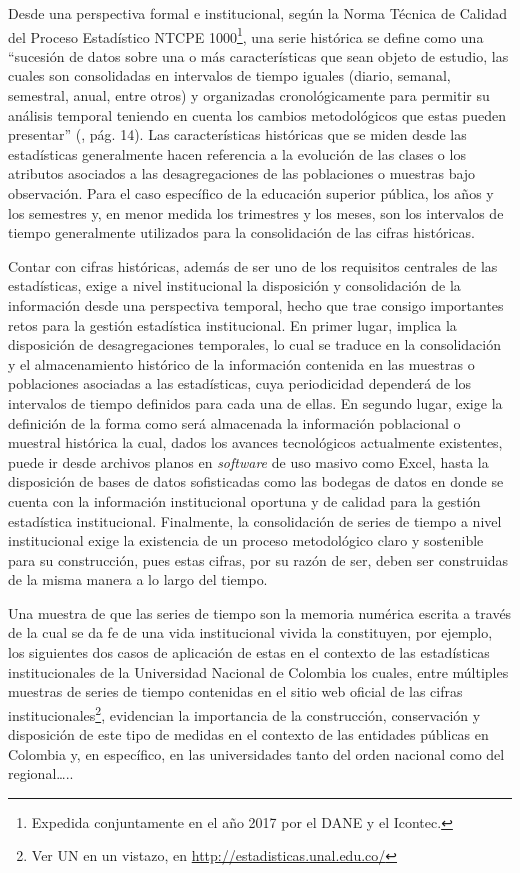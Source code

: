 \documentclass[
]{book}
\begin{document}
Desde una perspectiva formal e institucional, según la Norma Técnica de Calidad del Proceso Estadístico NTCPE 1000\footnote{Expedida conjuntamente en el año 2017 por el DANE y el Icontec.}, una serie histórica se define como una ``sucesión de datos sobre una o más características que sean objeto de estudio, las cuales son consolidadas en intervalos de tiempo iguales (diario, semanal, semestral, anual, entre otros) y organizadas cronológicamente para permitir su análisis temporal teniendo en cuenta los cambios metodológicos que estas pueden presentar'' (\citet{DaneIcontec}, pág. 14). Las características históricas que se miden desde las estadísticas generalmente hacen referencia a la evolución de las clases o los atributos asociados a las desagregaciones de las poblaciones o muestras bajo observación. Para el caso específico de la educación superior pública, los años y los semestres y, en menor medida los trimestres y los meses, son los intervalos de tiempo generalmente utilizados para la consolidación de las cifras históricas.

Contar con cifras históricas, además de ser uno de los requisitos centrales de las estadísticas, exige a nivel institucional la disposición y consolidación de la información desde una perspectiva temporal, hecho que trae consigo importantes retos para la gestión estadística institucional. En primer lugar, implica la disposición de desagregaciones temporales, lo cual se traduce en la consolidación y el almacenamiento histórico de la información contenida en las muestras o poblaciones asociadas a las estadísticas, cuya periodicidad dependerá de los intervalos de tiempo definidos para cada una de ellas. En segundo lugar, exige la definición de la forma como será almacenada la información poblacional o muestral histórica la cual, dados los avances tecnológicos actualmente existentes, puede ir desde archivos planos en \emph{software} de uso masivo como Excel, hasta la disposición de bases de datos sofisticadas como las bodegas de datos en donde se cuenta con la información institucional oportuna y de calidad para la gestión estadística institucional. Finalmente, la consolidación de series de tiempo a nivel institucional exige la existencia de un proceso metodológico claro y sostenible para su construcción, pues estas cifras, por su razón de ser, deben ser construidas de la misma manera a lo largo del tiempo.

Una muestra de que las series de tiempo son la memoria numérica escrita a través de la cual se da fe de una vida institucional vivida la constituyen, por ejemplo, los siguientes dos casos de aplicación de estas en el contexto de las estadísticas institucionales de la Universidad Nacional de Colombia los cuales, entre múltiples muestras de series de tiempo contenidas en el sitio web oficial de las cifras institucionales\footnote{Ver UN en un vistazo, en \url{http://estadisticas.unal.edu.co/}}, evidencian la importancia de la construcción, conservación y disposición de este tipo de medidas en el contexto de las entidades públicas en Colombia y, en específico, en las universidades tanto del orden nacional como del regional\ldots..
\end{document}
